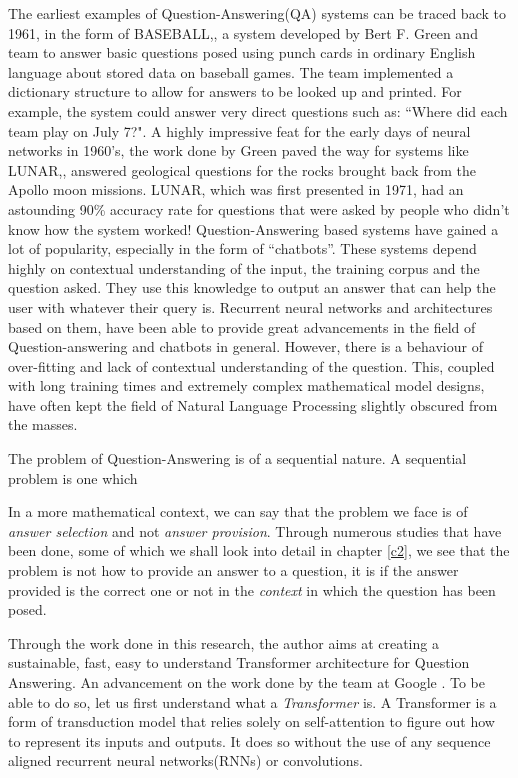 \documentclass[12pt]{report}
\begin{document}
    The earliest examples of Question-Answering(QA) systems can be traced back to 1961, in the form of BASEBALL,\citep{green1961baseball}, a system developed by Bert F. Green and team to answer basic questions posed using punch cards in ordinary English language about stored data on baseball games. The team implemented a dictionary structure to allow for answers to be looked up and printed. For example, the system could answer very direct questions such as: ``Where did each team play on July 7?".
    A highly impressive feat for the early days of neural networks in 1960's, the work done by Green paved the way for systems like LUNAR,\citep{lunar}, answered geological questions for the rocks brought back from the Apollo moon missions. LUNAR, which was first presented in 1971, had an astounding 90\% accuracy rate for questions that were asked by people who didn't know how the system worked!
    Question-Answering based systems have gained a lot of popularity, especially in the form of ``chatbots''. These systems depend highly on contextual understanding of the input, the training corpus and the question asked. They use this knowledge to output an answer that can help the user with whatever their query is. Recurrent neural networks and architectures based on them, have been able to provide great advancements in the field of Question-answering and chatbots in general. However, there is a behaviour of over-fitting and lack of contextual understanding of the question. This, coupled with long training times and extremely complex mathematical model designs, have often kept the field of Natural Language Processing slightly obscured from the masses.


    The problem of Question-Answering is of a sequential nature. A sequential problem is one which

    In a more mathematical context, we can say that the problem we face is of \textit{answer selection} and not \textit{answer provision}. Through numerous studies that have been done, some of which we shall look into detail in chapter \ref{c2}, we see that the problem is not how to provide an answer to a question, it is if the answer provided is the correct one or not in the \textit{context} in which the question has been posed.

    Through the work done in this research, the author aims at creating a sustainable, fast, easy to understand Transformer architecture for Question Answering. An advancement on the work done by the team at Google \citep{atayl}. To be able to do so, let us first understand what a \textit{Transformer} is.
    A Transformer is a form of transduction model that relies solely on self-attention to figure out how to represent its inputs and outputs. It does so without the use of any sequence aligned recurrent neural networks(RNNs) or convolutions.
\end{document}
